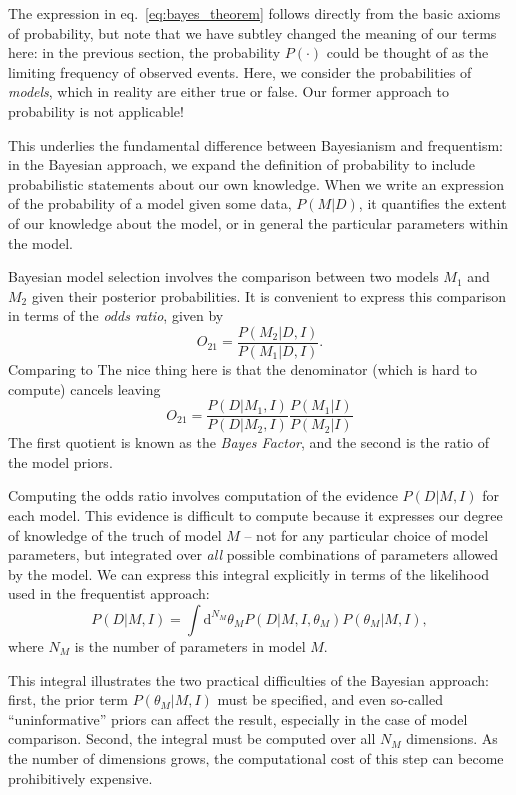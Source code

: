 \documentclass[12pt]{article}
\newcommand{\dd}{\mathrm{d}}
\newcommand{\eqn}[1]{eq.~\ref{eq:#1}}
\begin{document}
The expression in \eqn{bayes_theorem} follows directly from the basic axioms
of probability, but note that
we have subtley changed the meaning of our terms here:
in the previous section, the probability
$P(\cdot)$ could be thought of as the limiting frequency of observed events.
Here, we consider the probabilities of {\it models}, which in reality are
either true or false.  Our former approach to probability is not applicable!

This underlies the fundamental difference between Bayesianism and frequentism:
in the Bayesian approach, we expand the definition of probability to include
probabilistic statements about our own knowledge.  When we write an expression
of the probability of a model given some data, $P(M|D)$, it quantifies the
extent of our knowledge about the model, or in general the particular
parameters within the model.

Bayesian model selection involves the comparison between two models $M_1$
and $M_2$ given their posterior probabilities.  It is convenient to express
this comparison in terms of the {\it odds ratio}, given by
\begin{equation}
  O_{21} = \frac{P(M_2|D,I)}{P(M_1|D,I)}.
\end{equation}
Comparing to
The nice thing here is that the denominator (which is hard to compute) cancels
leaving
\begin{equation}
  O_{21} = \frac{P(D|M_1,I)}{P(D|M_2,I)}\frac{P(M_1|I)}{P(M_2|I)}
\end{equation}
The first quotient is known as the {\it Bayes Factor}, and the second is the
ratio of the model priors.

Computing the odds ratio involves computation of the evidence $P(D|M,I)$
for each model.  This evidence is difficult to compute because it expresses
our degree of knowledge of the truch of model $M$ -- not for any
particular choice of model parameters,
but integrated over {\it all} possible combinations of parameters allowed
by the model.  We can express this integral explicitly in terms of the
likelihood used in the frequentist approach:
\begin{equation}
  \label{eq:evidence_integral}
  P(D|M, I) = \int \dd^{N_M}\theta_M P(D|M, I, \theta_M)P(\theta_M|M, I),
\end{equation}
where $N_M$ is the number of parameters in model $M$.

This integral illustrates the two practical difficulties of the Bayesian
approach: first, the prior term $P(\theta_M|M,I)$ must be specified, and
even so-called ``uninformative'' priors can affect the result, especially
in the case of model comparison.  Second, the integral must be computed
over all $N_M$ dimensions.
As the number of dimensions grows, the computational cost of this step
can become prohibitively expensive.
\end{document}

